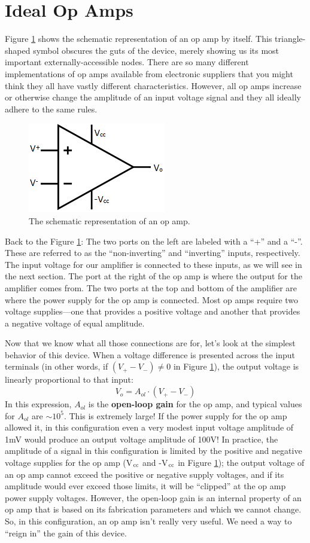 \section{Ideal Op Amps}
Figure \ref{firstOpAmp} shows the schematic representation of an op amp by itself. This triangle-shaped symbol obscures the guts of the device, merely showing us its most important externally-accessible nodes. There are so many different implementations of op amps available from electronic suppliers that you might think they all have vastly different characteristics. However, all op amps increase or otherwise change the amplitude of an input voltage signal and they all ideally adhere to the same rules.
\begin{figure}[h!]
\centering
\includegraphics[width=6cm]{figures/loneOpAmp.png}
\caption{The schematic representation of an op amp.}
\label{firstOpAmp}
\end{figure}
\par
Back to the Figure \ref{firstOpAmp}: The two ports on the left are labeled with a ``+'' and a ``-''. These are referred to as the ``non-inverting'' and ``inverting'' inputs, respectively. The input voltage for our amplifier is connected to these inputs, as we will see in the next section. The port at the right of the op amp is where the output for the amplifier comes from. The two ports at the top and bottom of the amplifier are where the power supply for the op amp is connected. Most op amps require two voltage supplies---one that provides a positive voltage and another that provides a negative voltage of equal amplitude.
\par
Now that we know what all those connections are for, let's look at the simplest behavior of this device. When a voltage difference is presented across the input terminals (in other words, if $(V_+-V_-)\neq0$ in Figure \ref{firstOpAmp}), the output voltage is linearly proportional to that input:
$$
V_o = A_{ol}\cdot (V_+-V_-)
$$
In this expression, $A_{ol}$ is the \textbf{open-loop gain} for the op amp, and typical values for $A_{ol}$ are $\sim10^5$. This is extremely large! If the power supply for the op amp allowed it, in this configuration even a very modest input voltage amplitude of 1mV would produce an output voltage amplitude of 100V! In practice, the amplitude of a signal in this configuration is limited by the positive and negative voltage supplies for the op amp (V$_{\textnormal{cc}}$ and -V$_{\textnormal{cc}}$ in Figure \ref{firstOpAmp}); the output voltage of an op amp cannot exceed the positive or negative supply voltages, and if its amplitude would ever exceed those limits, it will be ``clipped'' at the op amp power supply voltages. However, the open-loop gain is an internal property of an op amp that is based on its fabrication parameters and which we cannot change. So, in this configuration, an op amp isn't really very useful. We need a way to ``reign in'' the gain of this device.
